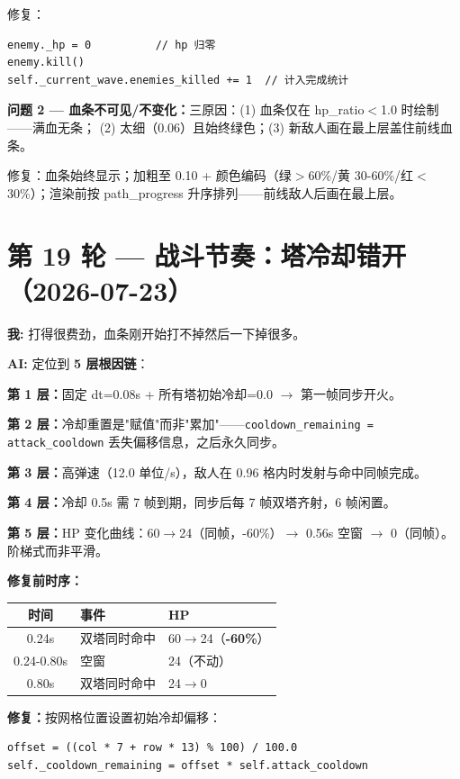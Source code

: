 \documentclass[12pt,a4paper]{ctexart}
\begin{document}
修复：
\begin{verbatim}
enemy._hp = 0          // hp 归零
enemy.kill()
self._current_wave.enemies_killed += 1  // 计入完成统计
\end{verbatim}

\textbf{问题 2 — 血条不可见/不变化：}三原因：(1) 血条仅在 hp\_ratio$<$1.0 时绘制——满血无条；
(2) 太细（0.06）且始终绿色；(3) 新敌人画在最上层盖住前线血条。

修复：血条始终显示；加粗至 0.10 + 颜色编码（绿$>$60\%/黄 30-60\%/红$<$30\%）；渲染前按
path\_progress 升序排列——前线敌人后画在最上层。

\section*{第 19 轮 — 战斗节奏：塔冷却错开（2026-07-23）}

\textbf{我:} 打得很费劲，血条刚开始打不掉然后一下掉很多。

\textbf{AI:} 定位到 \textbf{5 层根因链}：

\textbf{第 1 层：}固定 dt=0.08s + 所有塔初始冷却=0.0 $\rightarrow$ 第一帧同步开火。

\textbf{第 2 层：}冷却重置是"赋值"而非"累加"——\texttt{cooldown\_remaining = attack\_cooldown}
丢失偏移信息，之后永久同步。

\textbf{第 3 层：}高弹速（12.0 单位/s），敌人在 0.96 格内时发射与命中同帧完成。

\textbf{第 4 层：}冷却 0.5s 需 7 帧到期，同步后每 7 帧双塔齐射，6 帧闲置。

\textbf{第 5 层：}HP 变化曲线：60$\rightarrow$24（同帧，-60\%）$\rightarrow$ 0.56s 空窗 $\rightarrow$
0（同帧）。阶梯式而非平滑。

\textbf{修复前时序：}
\begin{center}
\begin{tabular}{cll}
\toprule
时间 & 事件 & HP \\
\midrule
0.24s & 双塔同时命中 & 60$\rightarrow$24（\textbf{-60\%}）\\
0.24-0.80s & 空窗 & 24（不动）\\
0.80s & 双塔同时命中 & 24$\rightarrow$0 \\
\bottomrule
\end{tabular}
\end{center}

\textbf{修复：}按网格位置设置初始冷却偏移：
\begin{verbatim}
offset = ((col * 7 + row * 13) % 100) / 100.0
self._cooldown_remaining = offset * self.attack_cooldown
\end{verbatim}
\end{document}
